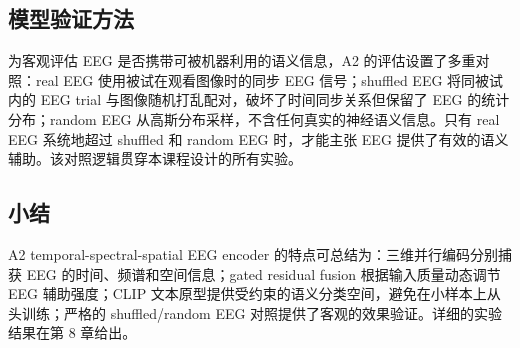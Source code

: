 \subsection{模型验证方法}

为客观评估 EEG 是否携带可被机器利用的语义信息，A2 的评估设置了多重对照：real EEG 使用被试在观看图像时的同步 EEG 信号；shuffled EEG 将同被试内的 EEG trial 与图像随机打乱配对，破坏了时间同步关系但保留了 EEG 的统计分布；random EEG 从高斯分布采样，不含任何真实的神经语义信息。只有 real EEG 系统地超过 shuffled 和 random EEG 时，才能主张 EEG 提供了有效的语义辅助。该对照逻辑贯穿本课程设计的所有实验。

\subsection{小结}

A2 temporal-spectral-spatial EEG encoder 的特点可总结为：三维并行编码分别捕获 EEG 的时间、频谱和空间信息；gated residual fusion 根据输入质量动态调节 EEG 辅助强度；CLIP 文本原型提供受约束的语义分类空间，避免在小样本上从头训练；严格的 shuffled/random EEG 对照提供了客观的效果验证。详细的实验结果在第 8 章给出。
